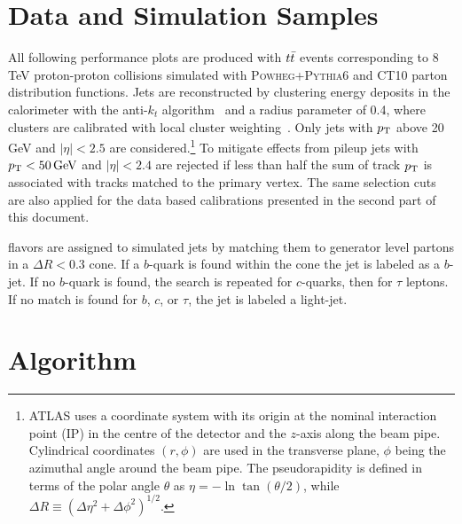 
\section{Data and Simulation Samples}
\label{tag:sec:data-and-simulation}

All following performance plots are produced with $t \bar{t}$ events corresponding to 8 TeV proton-proton collisions simulated with \textsc{Powheg+Pythia6} and \textsc{CT10} parton distribution functions. Jets are reconstructed by clustering energy deposits in the calorimeter with the anti-$k_t$ algorithm~\cite{antikt} and a radius parameter of 0.4, where clusters are calibrated with local cluster weighting~\cite{JES}. Only jets with $p_{\rm T}$ above 20 GeV and $|\eta| < 2.5$ are considered.\footnote{ATLAS
  uses a coordinate system with its origin
  at the nominal interaction point (IP) in the centre of the detector
  and the $z$-axis along the beam pipe.
  Cylindrical coordinates $(r,\phi)$ are used in the
  transverse plane, $\phi$ being the azimuthal angle around the beam
  pipe. The pseudorapidity is defined in terms of the polar angle
  $\theta$ as $\eta=-\ln\tan(\theta/2)$, while $\Delta R \equiv \left(\Delta\eta^2 + \Delta \phi^2\right)^{1/2}$.}
To mitigate effects from pileup jets with $p_{\rm T} < 50\,\text{GeV}$ and $|\eta| < 2.4$ are rejected if less than half the sum of track $p_{\rm T}$ is associated with tracks matched to the primary vertex. The same selection cuts are also applied for the data based calibrations presented in the second part of this document.

flavors{} are assigned to simulated jets by matching them to generator level partons in a $\Delta R < 0.3$ cone. If a $b$-quark is found within the cone the jet is labeled as a $b$-jet. If no $b$-quark is found, the search is repeated for $c$-quarks, then for $\tau$ leptons. If no match is found for $b$, $c$, or $\tau$, the jet is labeled a light-jet.





\section{Algorithm}
\label{tag:sec:algo}


